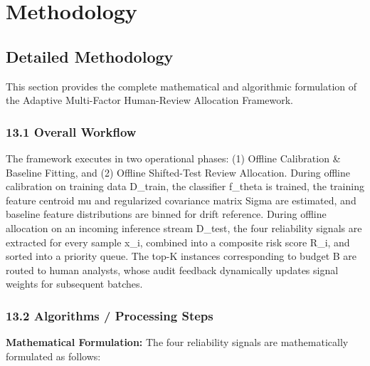 \chapter{Methodology}



\section{Detailed Methodology}

This section provides the complete mathematical and algorithmic formulation of the Adaptive Multi-Factor Human-Review Allocation Framework.

\subsection{13.1 Overall Workflow}

The framework executes in two operational phases: (1) Offline Calibration \& Baseline Fitting, and (2) Offline Shifted-Test Review Allocation. During offline calibration on training data D\_train, the classifier f\_theta is trained, the training feature centroid mu and regularized covariance matrix Sigma are estimated, and baseline feature distributions are binned for drift reference. During offline allocation on an incoming inference stream D\_test, the four reliability signals are extracted for every sample x\_i, combined into a composite risk score R\_i, and sorted into a priority queue. The top-K instances corresponding to budget B are routed to human analysts, whose audit feedback dynamically updates signal weights for subsequent batches.

\subsection{13.2 Algorithms / Processing Steps}

\textbf{Mathematical Formulation:} The four reliability signals are mathematically formulated as follows:

